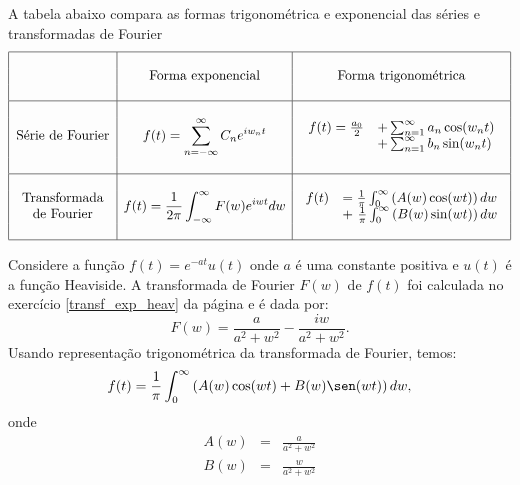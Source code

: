 A tabela abaixo compara as formas trigonométrica e exponencial das séries e transformadas de Fourier
\begin{equation}
\begin{array}{|c|c|c|}
\hline &&\\
&\hbox{Forma exponencial}&\hbox{Forma trigonométrica}\\&&\\  \hline &&\\
\hbox{Série de Fourier}&\displaystyle f(t)=\sum_{n=-\infty}^\infty C_n e^{i w_n t} & \begin{array}{ll} f(t)=\frac{a_0}{2}&+\sum_{n=1}^\infty a_n \cos(w_nt)\\ &+\sum_{n=1}^\infty b_n \sin(w_nt) \end{array}   \\&&\\\hline &&\\
\begin{array}{c}
    \hbox{Transformada}\\
    \hbox{de Fourier}
\end{array} &\displaystyle f(t)=\frac{1}{2\pi}\int_{-\infty}^\infty F(w)e^{iwt}dw & \begin{array}{ll} f(t)&=\frac{1}{\pi}\int_{0}^\infty \left( A(w)\cos(wt)\right)dw\\&+~\frac{1}{\pi}\int_{0}^\infty \left( B(w)\sin(wt)\right)dw \end{array} \\   &&\\\hline
\end{array}
\end{equation}
\begin{ex}{\label{ex_trans_rep_1}} Considere a função $f(t)=e^{-at}u(t)$ onde $a$ é uma constante positiva e $u(t)$ é a função Heaviside. A transformada de Fourier $F(w)$ de $f(t)$ foi calculada no exercício \ref{transf_exp_heav} da página \pageref{transf_exp_heav} e é dada por:
\begin{equation*}
F(w)=\frac{a}{a^2+w^2}-\frac{iw}{a^2+w^2}.
\end{equation*}
Usando representação trigonométrica da transformada de Fourier, temos:
\begin{eqnarray*}
f(t)=\frac{1}{\pi}\int_{0}^\infty\left( A(w)\cos(wt)+ B(w)\sen(wt)\right)dw,
\end{eqnarray*}
onde
\begin{eqnarray*}
A(w)&=&\frac{a}{a^2+w^2}\\
B(w)&=&\frac{w}{a^2+w^2}
\end{eqnarray*}
\end{ex}
